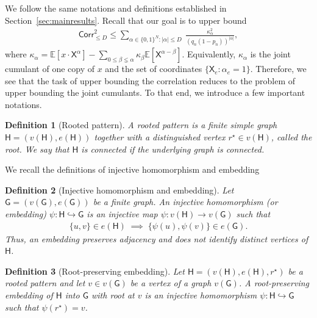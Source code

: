 \documentclass[12pt]{article}
\newtheorem{definition}{Definition}
\newcommand{\s}[1]{\mathsf{#1}}
\begin{document}
We follow the same notations and definitions established in Section~\ref{sec:mainresults}. Recall that our goal is to upper bound
\begin{align}
\s{Corr}_{\le D}^2\leq\sum_{\alpha\in\{0,1\}^N:|\alpha|\le D}\ \frac{\kappa_\alpha^2}{(q_n(1-p_n))^{|\alpha|}},
\end{align}
where $\kappa_\alpha=\mathbb E[x\cdot \s{X}^\alpha]-\sum_{0\le \beta\lneq \alpha}\kappa_\beta\mathbb E[\s{X}^{\alpha-\beta}]$. Equivalently, $\kappa_\alpha$ is the joint cumulant of one copy of $x$ and the set of coordinates $\{\s{X}_e:\alpha_e=1\}$. Therefore, we see that the task of upper bounding the correlation reduces to the problem of upper bounding the joint cumulants. To that end, we introduce a few important notations.
\begin{definition}[Rooted pattern]
A rooted pattern is a finite simple graph $\s{H}=(v(\s{H}),e(\s{H}))$ together with a distinguished
vertex $r^\star\in v(\s{H})$, called the root. We say that $\s{H}$ is \emph{connected} if the underlying graph is connected. %
\end{definition}
We recall the definitions of injective homomorphism and embedding\begin{definition}[Injective homomorphism and embedding]
Let $\s{G}=(v(\s{G}),e(\s{G}))$ be a finite graph. An \emph{injective homomorphism} (or \emph{embedding}) $\psi:\s{H}\hookrightarrow \s{G}$ is an injective map $\psi:v(\s{H})\to v(\s{G})$ such that
\begin{align}
\{u,v\}\in e(\s{H}) \;\implies\; \{\psi(u),\psi(v)\}\in e(\s{G}).
\end{align}
Thus, an embedding preserves adjacency and does not identify distinct vertices of $\s{H}$.
\end{definition}

\begin{definition}[Root-preserving embedding]
Let $\s{H}=(v(\s{H}),e(\s{H}),r^\star)$ be a rooted pattern and let $v\in v(\s{G})$ be a vertex of a graph $v(\s{G})$. A \emph{root-preserving embedding} of $\s{H}$ into $\s{G}$ with root at $v$ is an injective homomorphism
$\psi:\s{H}\hookrightarrow \s{G}$ such that $\psi(r^\star)=v$.
\end{definition}
\end{document}
